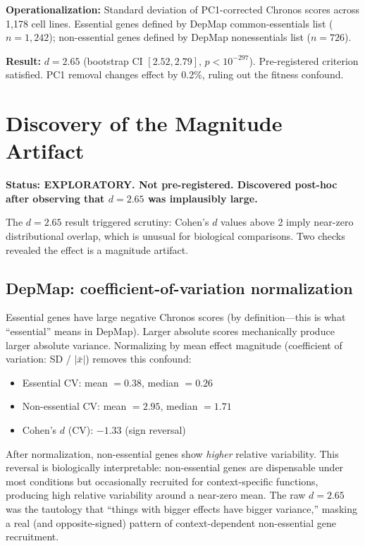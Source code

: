 \documentclass[11pt]{article}
\begin{document}
\textbf{Operationalization:} Standard deviation of PC1-corrected Chronos
scores across 1{,}178 cell lines. Essential genes defined by DepMap
common-essentials list ($n = 1{,}242$); non-essential genes defined by
DepMap nonessentials list ($n = 726$).

\textbf{Result:} $d = 2.65$ (bootstrap CI $[2.52, 2.79]$, $p <
10^{-297}$). Pre-registered criterion satisfied. PC1 removal changes
effect by 0.2\%, ruling out the fitness confound.

\section{Discovery of the Magnitude Artifact}
\label{sec:artifact}

\textbf{Status: EXPLORATORY. Not pre-registered. Discovered post-hoc
after observing that $d = 2.65$ was implausibly large.}

The $d = 2.65$ result triggered scrutiny: Cohen's $d$ values above 2
imply near-zero distributional overlap, which is unusual for biological
comparisons. Two checks revealed the effect is a magnitude artifact.

\subsection{DepMap: coefficient-of-variation normalization}

Essential genes have large negative Chronos scores (by definition---this
is what ``essential'' means in DepMap). Larger absolute scores
mechanically produce larger absolute variance. Normalizing by mean
effect magnitude (coefficient of variation: SD / $|\bar{x}|$) removes
this confound:

\begin{itemize}
  \item Essential CV: mean $= 0.38$, median $= 0.26$
  \item Non-essential CV: mean $= 2.95$, median $= 1.71$
  \item Cohen's $d$ (CV): $-1.33$ (sign reversal)
\end{itemize}

After normalization, non-essential genes show \emph{higher} relative
variability. This reversal is biologically interpretable: non-essential
genes are dispensable under most conditions but occasionally recruited
for context-specific functions, producing high relative variability
around a near-zero mean. The raw $d = 2.65$ was the tautology that
``things with bigger effects have bigger variance,'' masking a real (and
opposite-signed) pattern of context-dependent non-essential gene
recruitment.
\end{document}

